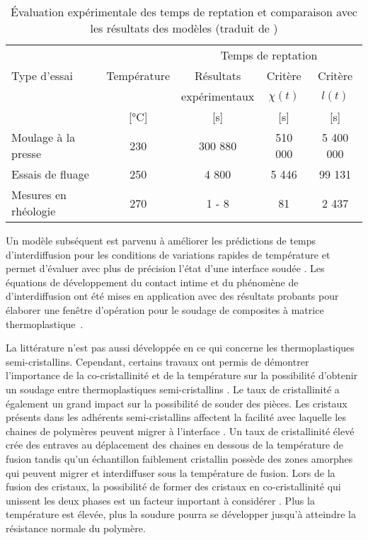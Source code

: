 \begin{table}[h]
	\centering
	\caption{Évaluation expérimentale des temps de reptation et comparaison avec les résultats des modèles (traduit de \cite{Bastien1991})}
	\label{tab:temps_de_reptation_Bastien}
	\begin{tabular}{@{}lcccc@{}}
		\toprule
		& \multicolumn{1}{l}{} &          \multicolumn{3}{c}{Temps de reptation}          \\
		Type d'essai         &          Température &      Résultats &          Critère &  Critère \\
		&                      &   expérimentaux & $\chi(t)$ & $l(t)$ \\
		&      [\si{\celsius}] & [\si{\second}] &   [\si{\second}] &       [\si{\second}] \\ \midrule
		Moulage à la presse  &                  230 &        300 880 &          510 000 &            5 400 000 \\
		Essais de fluage     &                  250 &           4 800 &             5 446 &               99 131 \\
		Mesures en rhéologie &                  270 &          1 - 8 &               81 &                 2 437 \\ \bottomrule
	\end{tabular}%
\end{table}

Un modèle subséquent est parvenu à améliorer les prédictions de temps d'interdiffusion pour les conditions de variations rapides de température et permet d'évaluer avec plus de précision l'état d'une interface soudée \cite{F.Yang2002}. 
Les équations de développement du contact intime et du phénomène de d'interdiffusion ont été mises en application avec des résultats probants pour élaborer une fenêtre d'opération pour le soudage de composites à matrice thermoplastique~\cite{Ageorges1998}. 

La littérature n'est pas aussi développée en ce qui concerne les thermoplastiques semi-cristallins. 
Cependant, certains travaux ont permis de démontrer l'importance de la co-cristallinité et de la température sur la possibilité d'obtenir un soudage entre thermoplastiques semi-cristallins  \cite{Xue1998,Smith2001}. 
Le taux de cristallinité a également un grand impact sur la possibilité de souder des pièces. 
Les cristaux présents dans les adhérents semi-cristallins affectent la facilité avec laquelle les chaines de polymères peuvent migrer à l'interface \cite{Jarrousse2004}. 
Un taux de cristallinité élevé crée des entraves au déplacement des chaines en dessous de la température de fusion tandis qu'un échantillon faiblement cristallin possède des zones amorphes qui peuvent migrer et interdiffuser sous la température de fusion. 
Lors de la fusion des cristaux, la possibilité de former des cristaux en co-cristallinité qui unissent les deux phases est un facteur important à considérer \cite{Smith2001,Zanetto2001}. 
Plus la température est élevée, plus la soudure pourra se développer jusqu'à atteindre la résistance normale du polymère. 

